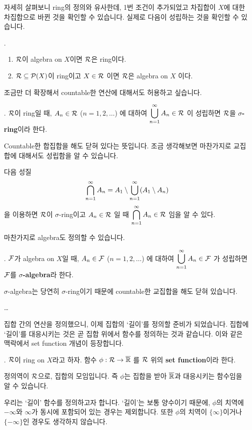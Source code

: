 자세히 살펴보니 ring의 정의와 유사한데, 1번 조건이 추가되었고 차집합이 \(X\)에 대한 차집합으로 바뀐 것을 확인할 수 있습니다. 실제로 다음이 성립하는 것을 확인할 수 있습니다.

\prop.
\begin{enumerate}
    \item \(\mathcal{R}\)이 algebra on \(X\)이면 \(\mathcal{R}\)은 ring이다.
    \item \(\mathcal{R} \subseteq \mathcal{P}(X)\)이 ring이고 \(X \in \mathcal{R}\) 이면 \(\mathcal{R}\)은 algebra on \(X\) 이다.
\end{enumerate}

조금만 더 확장해서 countable한 연산에 대해서도 허용하고 싶습니다.

.  \(\mathcal{R}\)이 ring일 때, \(A_n \in \mathcal{R}\) (\(n = 1, 2, \dots\)) 에 대하여 \(\displaystyle \bigcup_{n=1}^\infty A_n \in \mathcal{R}\) 이 성립하면 \(\mathcal{R}\)을 \textbf{\(\sigma\)-ring}이라 한다.

Countable한 합집합을 해도 닫혀 있다는 뜻입니다. 조금 생각해보면 마찬가지로 교집합에 대해서도 성립함을 알 수 있습니다.

\rmk 다음 성질
\[
    \bigcap_{n=1}^\infty A_n = A_1 \setminus \bigcup_{n=1}^\infty (A_1 \setminus A_n)
\]
을 이용하면 \(\mathcal{R}\)이 \(\sigma\)-ring이고 \(A_n \in \mathcal{R}\) 일 때 \(\displaystyle \bigcap_{n=1}^\infty A_n \in \mathcal{R}\) 임을 알 수 있다.

마찬가지로 algebra도 정의할 수 있습니다.

.  \(\mathcal{F}\)가 algebra on \(X\)일 때, \(A_n \in \mathcal{F}\) (\(n = 1, 2, \dots\)) 에 대하여 \(\displaystyle \bigcup_{n=1}^\infty A_n \in \mathcal{F}\) 가 성립하면 \(\mathcal{F}\)를 \textbf{\(\sigma\)-algebra}라 한다.

\(\sigma\)-algebra는 당연히 \(\sigma\)-ring이기 때문에 countable한 교집합을 해도 닫혀 있습니다.

\dots

집합 간의 연산을 정의했으니, 이제 집합의 `길이'를 정의할 준비가 되었습니다. 집합에 `길이'를 대응시키는 것은 곧 집합 위에서 함수를 정의하는 것과 같습니다. 이와 같은 맥락에서 set function 개념이 등장합니다.

.  \(\mathcal{R}\)이 ring on \(X\)라고 하자. 함수 \(\phi : \mathcal{R} \rightarrow \overline{\mathbb{R}}\) 를 \(\mathcal{R}\) 위의 \textbf{set function}이라 한다.

정의역이 \(\mathcal{R}\)으로, 집합의 모임입니다. 즉 \(\phi\)는 집합을 받아 \(\overline{\mathbb{R}}\)과 대응시키는 함수임을 알 수 있습니다.

우리는 `길이' 함수를 정의하고자 합니다. `길이'는 보통 양수이기 때문에, \(\phi\)의 치역에 \(-\infty\)와 \(\infty\)가 동시에 포함되어 있는 경우는 제외합니다. 또한 \(\phi\)의 치역이 \(\{\infty\}\)이거나 \(\{-\infty\}\)인 경우도 생각하지 않습니다.

